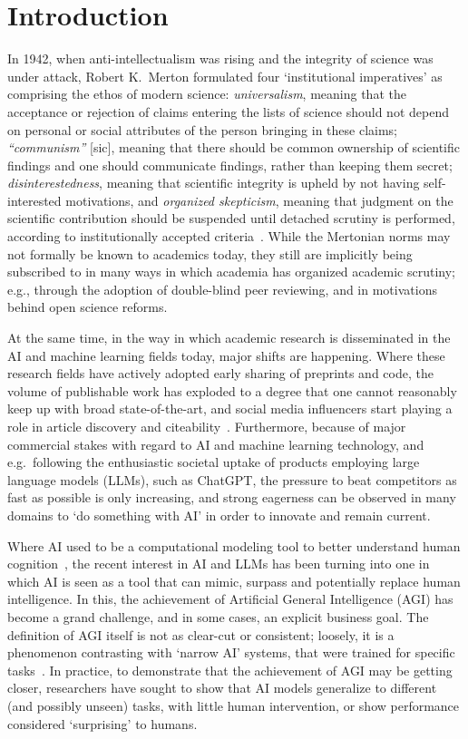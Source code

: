 \section{Introduction}\label{intro}

In 1942, when anti-intellectualism was rising and the integrity of science was under attack, Robert K.\ Merton formulated four `institutional imperatives' as comprising the ethos of modern science: \emph{universalism}, meaning that the acceptance or rejection of claims entering the lists of science should not depend on personal or social attributes of the person bringing in these claims; \emph{``communism''} [sic], meaning that there should be common ownership of scientific findings and one should communicate findings, rather than keeping them secret; \emph{disinterestedness}, meaning that scientific integrity is upheld by not having self-interested motivations, and \emph{organized skepticism}, meaning that judgment on the scientific contribution should be suspended until detached scrutiny is performed, according to institutionally accepted criteria~\citep{merton1942science}. While the Mertonian norms may not formally be known to academics today, they still are implicitly being subscribed to in many ways in which academia has organized academic scrutiny; e.g., through the adoption of double-blind peer reviewing, and in motivations behind open science reforms.

At the same time, in the way in which academic research is disseminated in the AI and machine learning fields today, major shifts are happening. Where these research fields have actively adopted early sharing of preprints and code, the volume of publishable work has exploded to a degree that one cannot reasonably keep up with broad state-of-the-art, and social media influencers start playing a role in article discovery and citeability~\citep{weissburg2024tweets}. Furthermore, because of major commercial stakes with regard to AI and machine learning technology, and e.g.\ following the enthusiastic societal uptake of products employing large language models (LLMs), such as ChatGPT, the pressure to beat competitors as fast as possible is only increasing, and strong eagerness can be observed in many domains to `do something with AI' in order to innovate and remain current.

Where AI used to be a computational modeling tool to better understand human cognition~\citep{vanrooij2023aitheoretical}, the recent interest in AI and LLMs has been turning into one in which AI is seen as a tool that can mimic, surpass and potentially replace human intelligence. In this, the achievement of Artificial General Intelligence (AGI) has become a grand challenge, and in some cases, an explicit business goal. The definition of AGI itself is not as clear-cut or consistent; loosely, it is a phenomenon contrasting with `narrow AI' systems, that were trained for specific tasks~\citep{goertzel2014artificial}. In practice, to demonstrate that the achievement of AGI may be getting closer, researchers have sought to show that AI models generalize to different (and possibly unseen) tasks, with little human intervention, or show performance considered `surprising' to humans.

